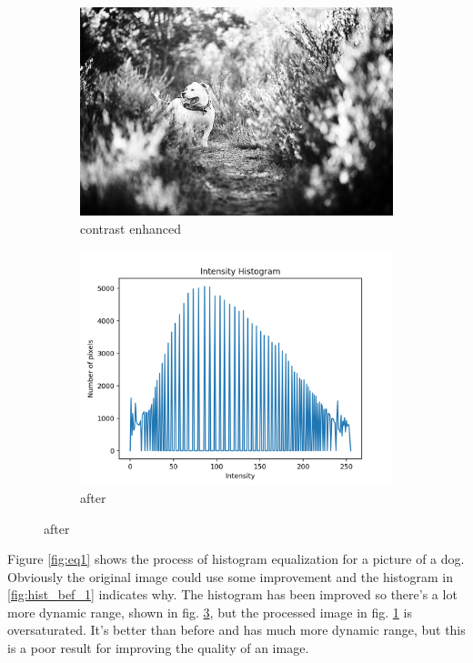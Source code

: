 \documentclass[11pt,a4paper]{article}
\begin{document}
\begin{figure}[ht]
	\ContinuedFloat
	\centering
	\begin{subfigure}[h]{0.7\textwidth}
		\includegraphics[width=\textwidth]{figs/lc1_ce}
		\caption{contrast enhanced}
		\label{fig:lc1_after}
	\end{subfigure}
	
	\begin{subfigure}[h]{0.75\textwidth}
		\includegraphics[width=\textwidth]{figs/lc1_hist_aft}
		\caption{after}
		\label{fig:hist_aft_1}
	\end{subfigure}
\end{figure}

Figure \ref{fig:eq1} shows the process of histogram equalization for a picture of a dog. Obviously the original image could use some improvement and the histogram in \ref{fig:hist_bef_1} indicates why. The histogram has been improved so there's a lot more dynamic range, shown in fig. \ref{fig:hist_aft_1}, but the processed image in fig. \ref{fig:lc1_after} is oversaturated. It's better than before and has much more dynamic range, but this is a poor result for improving the quality of an image.
\end{document}
